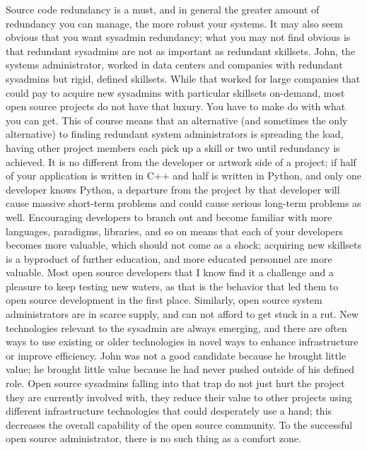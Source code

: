 Source code redundancy is a must, and in general the greater amount of
redundancy you can manage, the more robust your systems. It may also seem
obvious that you want sysadmin redundancy; what you may not find obvious is that
redundant sysadmins are not as important as redundant skillsets. John, the
systems administrator, worked in data centers and companies with redundant
sysadmins but rigid, defined skillsets. While that worked for large companies
that could pay to acquire new sysadmins with particular skillsets on-demand,
most open source projects do not have that luxury. You have to make do with what
you can get. This of course means that an alternative (and sometimes the only
alternative) to finding redundant system administrators is spreading the load,
having other project members each pick up a skill or two until redundancy is
achieved.
It is no different from the developer or artwork side of a project; if half of
your application is written in C++ and half is written in Python, and only one
developer knows Python, a departure from the project by that developer will
cause massive short-term problems and could cause serious long-term problems as
well. Encouraging developers to branch out and become familiar with more
languages, paradigms, libraries, and so on means that each of your developers
becomes more valuable, which should not come as a shock; acquiring new skillsets
is a byproduct of further education, and more educated personnel are more
valuable.
Most open source developers that I know find it a challenge and a pleasure to
keep testing new waters, as that is the behavior that led them to open source
development in the first place. Similarly, open source system administrators are
in scarce supply, and can not afford to get stuck in a rut. New technologies
relevant to the sysadmin are always emerging, and there are often ways to use
existing or older technologies in novel ways to enhance infrastructure or
improve efficiency.
John was not a good candidate because he brought little value; he brought little
value because he had never pushed outside of his defined role. Open source
sysadmins falling into that trap do not just hurt the project they are currently
involved with, they reduce their value to other projects using different
infrastructure technologies that could desperately use a hand; this decreases
the overall capability of the open source community. To the successful open
source administrator, there is no such thing as a comfort zone.
 
